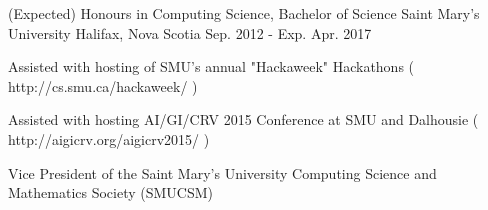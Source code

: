 

\begin{cventries}

  \cventry
    {(Expected) Honours in Computing Science, Bachelor of Science} %
    {Saint Mary's University} %
    {Halifax, Nova Scotia} %
    {Sep. 2012 - Exp. Apr. 2017} %
    {
      \begin{cvitems} %
        \item {Assisted with hosting of SMU's annual "Hackaweek" Hackathons ( http://cs.smu.ca/hackaweek/ ) }
	\item {Assisted with hosting AI/GI/CRV 2015 Conference at SMU and Dalhousie ( http://aigicrv.org/aigicrv2015/ ) }
	\item {Vice President of the Saint Mary's University Computing Science and Mathematics Society (SMUCSM) }
      \end{cvitems}
    }

\end{cventries}
